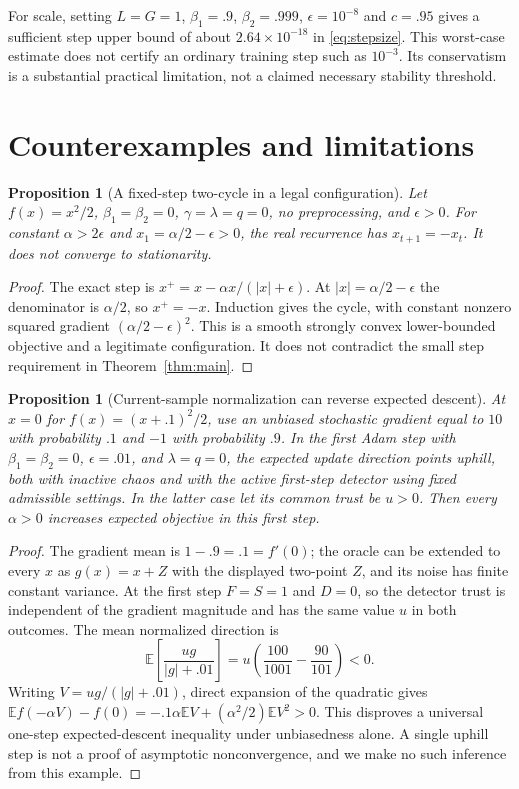 \documentclass[11pt]{article}
\newtheorem{proposition}[theorem]{Proposition}
\theoremstyle{definition}
\theoremstyle{remark}
\newcommand{\E}{\mathbb E}
\begin{document}
For scale, setting $L=G=1$, $\beta_1=.9$, $\beta_2=.999$,
$\epsilon=10^{-8}$ and $c=.95$ gives a sufficient step upper bound of about
$2.64\times10^{-18}$ in \eqref{eq:stepsize}. This worst-case estimate does not
certify an ordinary training step such as $10^{-3}$. Its conservatism is a
substantial practical limitation, not a claimed necessary stability threshold.

\section{Counterexamples and limitations}\label{sec:counterexamples}
\begin{proposition}[A fixed-step two-cycle in a legal configuration]\label{prop:cycle}
Let $f(x)=x^2/2$, $\beta_1=\beta_2=0$, $\gamma=\lambda=q=0$, no
preprocessing, and $\epsilon>0$. For constant $\alpha>2\epsilon$ and
$x_1=\alpha/2-\epsilon>0$, the real recurrence has $x_{t+1}=-x_t$.
It does not converge to stationarity.
\end{proposition}
\begin{proof}
The exact step is $x^+=x-\alpha x/(|x|+\epsilon)$. At
$|x|=\alpha/2-\epsilon$ the denominator is $\alpha/2$, so $x^+=-x$.
Induction gives the cycle, with constant nonzero squared gradient
$(\alpha/2-\epsilon)^2$. This is a smooth strongly convex lower-bounded
objective and a legitimate configuration. It does not contradict the small
step requirement in Theorem~\ref{thm:main}.
\end{proof}

\begin{proposition}[Current-sample normalization can reverse expected descent]\label{prop:bias}
At $x=0$ for $f(x)=(x+.1)^2/2$, use an unbiased stochastic gradient equal to
$10$ with probability $.1$ and $-1$ with probability $.9$. In the first Adam
step with $\beta_1=\beta_2=0$, $\epsilon=.01$, and $\lambda=q=0$, the expected
update direction points uphill, both with inactive chaos and with the active
first-step detector using fixed admissible settings. In the latter case let
its common trust be $u>0$. Then every $\alpha>0$ increases expected objective
in this first step.
\end{proposition}
\begin{proof}
The gradient mean is $1-.9=.1=f'(0)$; the oracle can be extended to every $x$
as $g(x)=x+Z$ with the displayed two-point $Z$, and its noise has finite
constant variance. At the first step $F=S=1$ and $D=0$, so the detector trust
is independent of the gradient magnitude and has the same value $u$ in both
outcomes. The mean normalized direction is
\[
 \E\left[\frac{u g}{|g|+.01}\right]
 =u\left(\frac{100}{1001}-\frac{90}{101}\right)<0.
\]
Writing $V=ug/(|g|+.01)$, direct expansion of the quadratic gives
$\E f(-\alpha V)-f(0)=-.1\alpha\E V+(\alpha^2/2)\E V^2>0$.
This disproves a universal one-step expected-descent inequality under
unbiasedness alone. A single uphill step is not a proof of asymptotic
nonconvergence, and we make no such inference from this example.
\end{proof}
\end{document}
